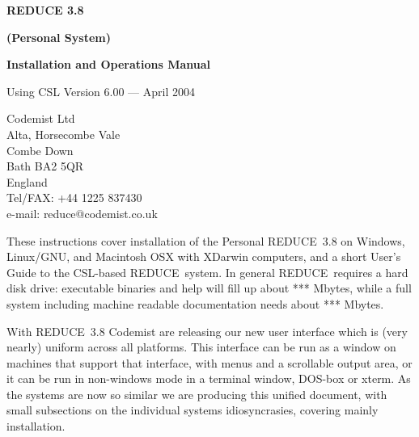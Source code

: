 \newcommand{\REDUCE}{REDUCE}

\thispagestyle{empty}
\vspace{4cm}
\begin{center} {\Huge \bf REDUCE 3.8} \end{center}
\vspace{.3cm}
\begin{center} {\Huge \bf (Personal System)} \end{center}
\vspace{.5cm}
\begin{center} {\LARGE \bf Installation and Operations Manual} \end{center}
\vspace{.3cm}
\begin{center} {\Large Using CSL Version 6.00 --- April 2004} \end{center}

\vspace{8cm}
\begin{center}
Codemist Ltd \\
Alta, Horsecombe Vale \\
Combe Down \\
Bath BA2 5QR \\
England \\
Tel/FAX: +44 1225 837430 \\
e-mail: reduce@codemist.co.uk
\end{center}

\vspace{1cm} These instructions cover installation of the Personal
\REDUCE\  3.8 on Windows, Linux/GNU, and Macintosh OSX with XDarwin
computers, and a short User's Guide to the CSL-based \REDUCE\  system.
In general \REDUCE\  requires a hard disk drive: executable binaries and
help will
fill up about *** Mbytes, while a full system including machine readable
documentation needs about *** Mbytes. 

\newpage
\tableofcontents
\newpage

With \REDUCE\ 3.8 Codemist are releasing our new user interface which is
(very nearly) uniform across all platforms.  This interface can be run
as a window on machines that support that interface, with menus and a
scrollable output area, or it can be run in non-windows mode in a
terminal window, DOS-box or xterm.  As the systems are now so similar
we are producing this unified document, with small subsections on the
individual systems idiosyncrasies, covering mainly installation.

